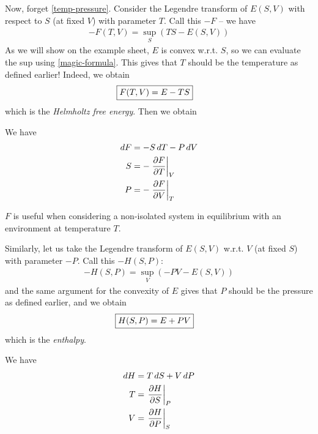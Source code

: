 \documentclass{../../template/note}
\begin{document}
    Now, forget \cref{temp-pressure}. Consider the Legendre transform of $E(S, V)$ with respect to $S$ (at fixed $V$) with parameter $T$. Call this $-F$ -- we have
    \begin{align*}
        -F(T, V) = \sup_S \left(TS - E(S, V)\right)
    \end{align*}
    As we will show on the example sheet, $E$ is convex w.r.t. $S$, so we can evaluate the sup using \cref{magic-formula}. This gives that $T$ should be the temperature as defined earlier! Indeed, we obtain
    \begin{align*}
        \Aboxed{F(T, V) = E - TS}
    \end{align*}
    which is the \emph{Helmholtz free energy}. Then we obtain
    \begin{proposition}
        We have
        \begin{align*}
            dF &= -S \D T - P \D V \\
            S &= -\pd[V]{F}{T} \\
            P &= -\pd[T]{F}{V}
        \end{align*}
    \end{proposition}
    
    \begin{remark*}
        $F$ is useful when considering a non-isolated system in equilibrium with an environment at temperature $T$.
    \end{remark*}
    
    Similarly, let us take the Legendre transform of $E(S, V)$ w.r.t. $V$ (at fixed $S$) with parameter $-P$. Call this $-H(S, P)$:
    \begin{align*}
        -H(S, P) = \sup_V \left(-PV - E(S, V)\right)
    \end{align*}
    and the same argument for the convexity of $E$ gives that $P$ should be the pressure as defined earlier, and we obtain
    \begin{align*}
        \Aboxed{H(S, P) = E + PV}
    \end{align*}
    which is the \emph{enthalpy}.
    
    \begin{proposition}
        We have
        \begin{align*}
            dH &= T \D S + V \D P \\
            T &= \pd[P]{H}{S} \\
            V &= \pd[S]{H}{P}
        \end{align*}
    \end{proposition}
    
\end{document}
